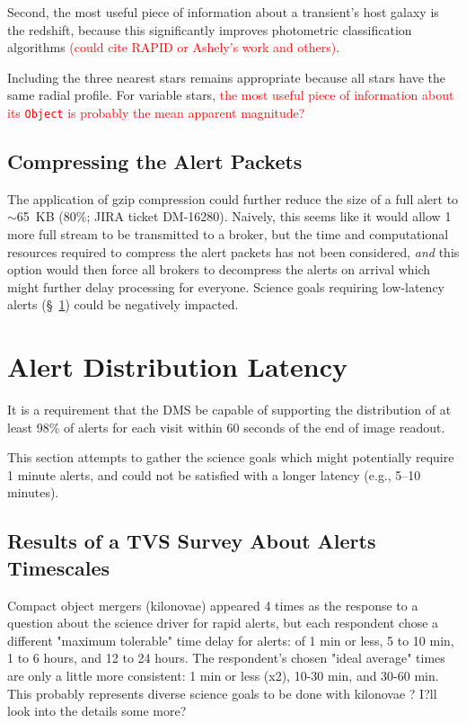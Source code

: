 \documentclass[DM,lsstdraft,authoryear,toc]{lsstdoc}
\begin{document}
Second, the most useful piece of information about a transient's host galaxy is the redshift, because this significantly improves photometric classification algorithms \textcolor{red}{(could cite RAPID or Ashely's work and others)}. 

Including the three nearest stars remains appropriate because all stars have the same radial profile. For variable stars, \textcolor{red}{the most useful piece of information about its {\tt Object} is probably the mean apparent magnitude?}


\subsection{Compressing the Alert Packets}\label{ssec:packets_compress}

The application of gzip compression could further reduce the size of a full alert to $\sim$65~KB (80\%; JIRA ticket DM-16280). Naively, this seems like it would allow 1 more full stream to be transmitted to a broker, but the time and computational resources required to compress the alert packets has not been considered, \emph{and} this option would then force all brokers to decompress the alerts on arrival which might further delay processing for everyone. Science goals requiring low-latency alerts (\S~\ref{sec:latency}) could be negatively impacted.



\section{Alert Distribution Latency} \label{sec:latency}

It is a requirement that the DMS be capable of supporting the distribution of at least 98\% of alerts for each visit within 60 seconds of the end of image readout.

This section attempts to gather the science goals which might potentially require 1 minute alerts, and could not be satisfied with a longer latency (e.g., 5--10 minutes).

\subsection{Results of a TVS Survey About Alerts Timescales}

Compact object mergers (kilonovae) appeared 4 times as the response to a question about the science driver for rapid alerts, but each respondent chose a different "maximum tolerable" time delay for alerts: of 1 min or less, 5 to 10 min, 1 to 6 hours, and 12 to 24 hours. The respondent's chosen "ideal average" times are only a little more consistent: 1 min or less (x2), 10-30 min, and 30-60 min. This probably represents diverse science goals to be done with kilonovae ? I?ll look into the details some more?
\end{document}
